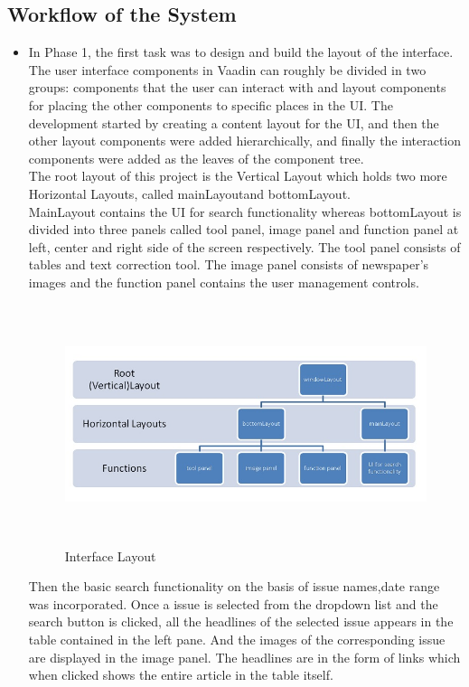 \documentclass[12pt]{article}
\begin{document}
\subsection{Workflow of the System}
\begin{itemize}
    \item In Phase 1, the first task was to design and build the layout of the interface. The user interface components in Vaadin can roughly be divided in two groups: components that the user can interact with and layout components for placing the other components to specific places in the UI. The development started by creating a content layout for the UI, and then the other layout components were added hierarchically, and finally the interaction components were added as the leaves of the component tree.\\

The root layout of this project is the Vertical Layout which holds two more Horizontal Layouts, called \textgravedbl mainLayout\textasciidieresis and \textgravedbl bottomLayout\textasciidieresis.\\
MainLayout contains the UI for search functionality whereas bottomLayout is divided into three panels called tool panel, image panel and function panel at left, center and right side of the screen respectively. The tool panel consists of tables and text correction tool. The image panel consists of newspaper's images and the function panel contains the user management controls.\\

\begin{figure}[ht!]
\centering
\includegraphics[width=14cm,height=7cm]{layouts.jpg}
\caption{Interface Layout}
\label{fig:1}
\end{figure}

Then the basic search functionality on the basis of issue names,date range was incorporated. Once a issue is selected from the dropdown list and the search button is clicked, all the headlines of the selected issue appears in the table contained in the left pane. And the images of the corresponding issue are displayed in the image panel. The headlines are in the form of links which when clicked shows the entire article in the table itself.


\end{itemize}
\end{document}
